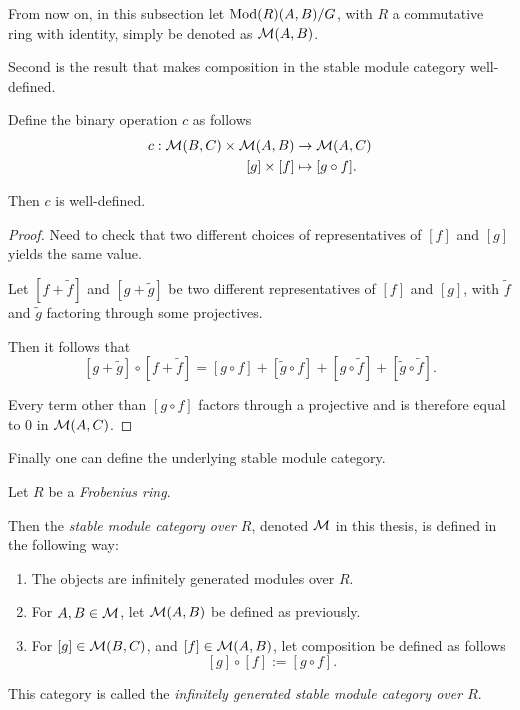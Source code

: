From now on, in this subsection let \( \operatorname{Mod}(R)(A, B)/G \), with \( R \) a commutative ring with identity, simply be denoted as \( {\mathcal{M}}(A, B) \).

Second is the result that makes composition in the stable module category well-defined.

\begin{lemma}
    \label{lem:stmod_composition_well-defined}
    Define the binary operation \( c \) as follows
    \begin{align*}
        c: {\mathcal{M}}(B, C) \times {\mathcal{M}}(A, B) &\to {\mathcal{M}}(A, C) \\
        [g] \times [f] &\mapsto [g \circ f].
    \end{align*}

    Then \( c \) is well-defined.
\end{lemma}
\begin{proof}
    Need to check that two different choices of representatives of \( [f] \) and \( [g] \) yields the same value.

    Let \( [f + \widetilde{f}] \) and \( [g + \widetilde{g}] \) be two different representatives of \( [f] \) and \( [g] \), with \( \widetilde{f} \) and \( \widetilde{g} \) factoring through some projectives.

    Then it follows that
    \[
         [g + \widetilde{g}] \circ [f + \widetilde{f}] = [g \circ f] + [\widetilde{g} \circ f] + [g \circ \widetilde{f}] + [\widetilde{g} \circ \widetilde{f}].
    \]
    
    Every term other than \( [g \circ f] \) factors through a projective and is therefore equal to \( 0 \) in \( {\mathcal{M}}(A, C) \).
\end{proof}

Finally one can define the underlying stable module category.

\begin{definition}
    \label{def:stable_module_category}
    Let \( R \) be a \emph{Frobenius ring}.

    Then the \emph{stable module category over \( R \)}, denoted \( {\mathcal{M}} \) in this thesis, is defined in the following way:
    \begin{enumerate}
        \item {
            The objects are infinitely generated modules over \( R \).
        }
        \item {
            For \( A, B \in {\mathcal{M}} \), let \( {\mathcal{M}}(A, B) \) be defined as previously.
        }
        \item {
            For \( [g] \in {\mathcal{M}}(B, C) \), and \( [f] \in {\mathcal{M}}(A, B) \), let composition be defined as follows
            \[
                [g] \circ [f] := [g \circ f].
            \]
        }
    \end{enumerate}

    This category is called the \emph{infinitely generated stable module category over \( R \)}.
\end{definition}

